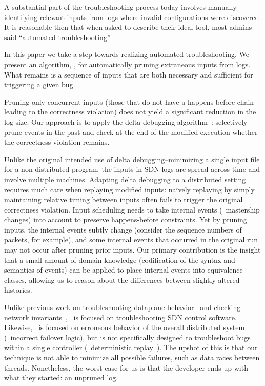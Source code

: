 A substantial part of the troubleshooting process today involves manually
identifying relevant inputs
from logs where invalid configurations
were discovered. It is reasonable then that when asked to describe their
ideal tool, most admins said ``automated troubleshooting''~\cite{Zeng:Survey}.

In this paper we take a step towards realizing automated troubleshooting.
We present an algorithm, \simulator, for automatically pruning extraneous
inputs from logs. What remains is a sequence of inputs that are both necessary and sufficient for
triggering a given bug.

Pruning only concurrent inputs (those that do not have a
happens-before chain~\cite{Lamport:1978:TCO:359545.359563} leading to the correctness violation)
does not yield a significant reduction in the log size. Our approach is
to apply the delta debugging algorithm~\cite{Zeller:2002:SIF:506201.506206}:
selectively prune events in the past and check at the end of
the modified execution whether the correctness violation remains.

Unlike the original intended use of delta debugging--minimizing a single
input file for a non-distributed program--the inputs in SDN logs are spread across
time and involve multiple machines. Adapting delta debugging to a distributed
setting requires much care when replaying modified inputs:
na\"ively replaying by simply maintaining relative timing between inputs often
fails to trigger the original correctness
violation. Input scheduling
needs to take internal events (\eg~mastership changes) into account to
preserve happens-before constraints. Yet by pruning inputs, the internal events
subtly change (consider the sequence numbers of packets, for example),
and some internal events that occurred in the original
run may not occur after pruning prior inputs.
Our primary contribution is the insight that a small amount of domain knowledge
(codification of the syntax and semantics of events) can be applied to
place internal events into equivalence classes, allowing us to reason about the
differences between slightly altered histories.

Unlike previous work on troubleshooting dataplane behavior~\cite{handigol2012debugger}
and checking network invariants~\cite{hsa,anteater,khurshid2012veriflow},
\simulator~is focused on troubleshooting SDN control software.
Likewise, \simulator~is focused on erroneous
behavior of the overall distributed system (\eg~incorrect
failover logic), but is not specifically designed to troubleshoot bugs within a single controller
(\cf~deterministic replay~\cite{Dunlap:2002:REI:844128.844148}). The upshot of
this is that our technique is not able to minimize all possible failures, such as
data races between threads. Nonetheless, the worst case for us is that the developer ends up with what they started:
an unpruned log.

